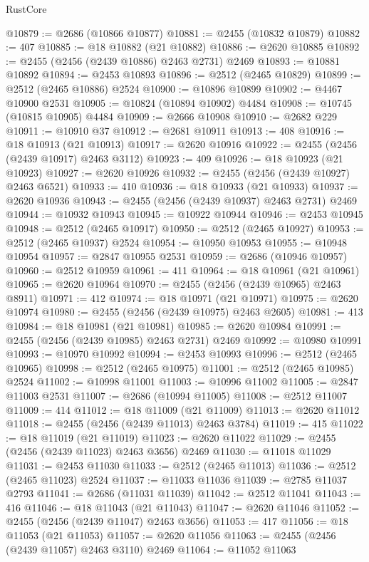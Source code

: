 \begin{lexlean}{RustCore}
\begin{coremodule}
@10879 := @2686 (@10866 @10877)
@10881 := @2455 (@10832 @10879)
@10882 := 407
@10885 := @18 @10882 (@21 @10882)
@10886 := @2620 @10885
@10892 := @2455 (@2456 (@2439 @10886) @2463 @2731) @2469
@10893 := @10881 @10892
@10894 := @2453 @10893
@10896 := @2512 (@2465 @10829)
@10899 := @2512 (@2465 @10886) @2524
@10900 := @10896 @10899
@10902 := @4467 @10900 @2531
@10905 := @10824 (@10894 @10902) @4484
@10908 := @10745 (@10815 @10905) @4484
@10909 := @2666 @10908
@10910 := @2682 @229
@10911 := @10910 @37
@10912 := @2681 @10911
@10913 := 408
@10916 := @18 @10913 (@21 @10913)
@10917 := @2620 @10916
@10922 := @2455 (@2456 (@2439 @10917) @2463 @3112)
@10923 := 409
@10926 := @18 @10923 (@21 @10923)
@10927 := @2620 @10926
@10932 := @2455 (@2456 (@2439 @10927) @2463 @6521)
@10933 := 410
@10936 := @18 @10933 (@21 @10933)
@10937 := @2620 @10936
@10943 := @2455 (@2456 (@2439 @10937) @2463 @2731) @2469
@10944 := @10932 @10943
@10945 := @10922 @10944
@10946 := @2453 @10945
@10948 := @2512 (@2465 @10917)
@10950 := @2512 (@2465 @10927)
@10953 := @2512 (@2465 @10937) @2524
@10954 := @10950 @10953
@10955 := @10948 @10954
@10957 := @2847 @10955 @2531
@10959 := @2686 (@10946 @10957)
@10960 := @2512 @10959
@10961 := 411
@10964 := @18 @10961 (@21 @10961)
@10965 := @2620 @10964
@10970 := @2455 (@2456 (@2439 @10965) @2463 @8911)
@10971 := 412
@10974 := @18 @10971 (@21 @10971)
@10975 := @2620 @10974
@10980 := @2455 (@2456 (@2439 @10975) @2463 @2605)
@10981 := 413
@10984 := @18 @10981 (@21 @10981)
@10985 := @2620 @10984
@10991 := @2455 (@2456 (@2439 @10985) @2463 @2731) @2469
@10992 := @10980 @10991
@10993 := @10970 @10992
@10994 := @2453 @10993
@10996 := @2512 (@2465 @10965)
@10998 := @2512 (@2465 @10975)
@11001 := @2512 (@2465 @10985) @2524
@11002 := @10998 @11001
@11003 := @10996 @11002
@11005 := @2847 @11003 @2531
@11007 := @2686 (@10994 @11005)
@11008 := @2512 @11007
@11009 := 414
@11012 := @18 @11009 (@21 @11009)
@11013 := @2620 @11012
@11018 := @2455 (@2456 (@2439 @11013) @2463 @3784)
@11019 := 415
@11022 := @18 @11019 (@21 @11019)
@11023 := @2620 @11022
@11029 := @2455 (@2456 (@2439 @11023) @2463 @3656) @2469
@11030 := @11018 @11029
@11031 := @2453 @11030
@11033 := @2512 (@2465 @11013)
@11036 := @2512 (@2465 @11023) @2524
@11037 := @11033 @11036
@11039 := @2785 @11037 @2793
@11041 := @2686 (@11031 @11039)
@11042 := @2512 @11041
@11043 := 416
@11046 := @18 @11043 (@21 @11043)
@11047 := @2620 @11046
@11052 := @2455 (@2456 (@2439 @11047) @2463 @3656)
@11053 := 417
@11056 := @18 @11053 (@21 @11053)
@11057 := @2620 @11056
@11063 := @2455 (@2456 (@2439 @11057) @2463 @3110) @2469
@11064 := @11052 @11063

\end{coremodule}
\end{lexlean}
